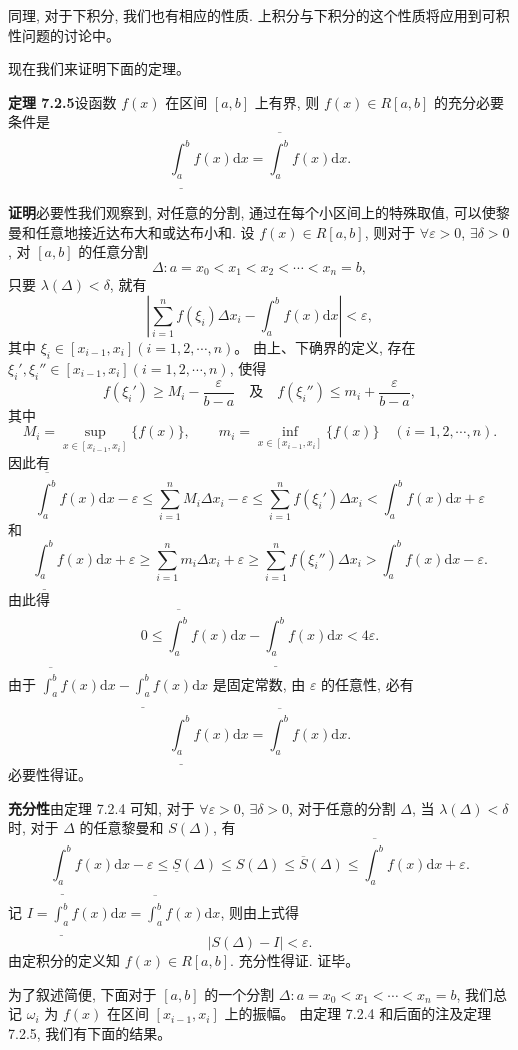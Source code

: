 \documentclass[UTF8,12pt,a4paper,fontset=fandol]{ctexart}
\begin{document}
同理, 对于下积分, 我们也有相应的性质. 上积分与下积分的这个性质将应用到可积性问题的讨论中。

现在我们来证明下面的定理。

\noindent\textbf{定理 7.2.5}\quad 设函数 $f(x)$ 在区间 $[a,b]$ 上有界, 则 $f(x)\in R[a,b]$ 的充分必要条件是
\[
  \underline{\int_a^b} f(x)\mathrm dx=\overline{\int_a^b} f(x)\mathrm dx.
\]

\noindent\textbf{证明}\quad 必要性\quad 我们观察到, 对任意的分割, 通过在每个小区间上的特殊取值, 可以使黎曼和任意地接近达布大和或达布小和. 设 $f(x)\in R[a,b]$, 则对于 $\forall\varepsilon>0$, $\exists\delta>0$, 对 $[a,b]$ 的任意分割
\[
  \Delta:a=x_0<x_1<x_2<\cdots<x_n=b,
\]
只要 $\lambda(\Delta)<\delta$, 就有
\[
  \left|\sum_{i=1}^n f(\xi_i)\Delta x_i-\int_a^b f(x)\mathrm dx\right|<\varepsilon,
\]
其中 $\xi_i\in[x_{i-1},x_i](i=1,2,\cdots,n)$。
由上、下确界的定义, 存在 $\xi_i',\xi_i''\in[x_{i-1},x_i](i=1,2,\cdots,n)$, 使得
\[
  f(\xi_i')\geq M_i-\frac{\varepsilon}{b-a}\quad\text{及}\quad f(\xi_i'')\leq m_i+\frac{\varepsilon}{b-a},
\]
其中
\[
  M_i=\sup_{x\in[x_{i-1},x_i]}\{f(x)\},\qquad
  m_i=\inf_{x\in[x_{i-1},x_i]}\{f(x)\}\quad(i=1,2,\cdots,n).
\]
因此有
\[
  \overline{\int_a^b} f(x)\mathrm dx-\varepsilon
  \leq \sum_{i=1}^n M_i\Delta x_i-\varepsilon
  \leq \sum_{i=1}^n f(\xi_i')\Delta x_i
  < \int_a^b f(x)\mathrm dx+\varepsilon
\]
和
\[
  \underline{\int_a^b} f(x)\mathrm dx+\varepsilon
  \geq \sum_{i=1}^n m_i\Delta x_i+\varepsilon
  \geq \sum_{i=1}^n f(\xi_i'')\Delta x_i
  > \int_a^b f(x)\mathrm dx-\varepsilon.
\]
由此得
\[
  0\leq \overline{\int_a^b} f(x)\mathrm dx-\underline{\int_a^b} f(x)\mathrm dx<4\varepsilon.
\]
由于 $\overline{\int_a^b} f(x)\mathrm dx-\underline{\int_a^b} f(x)\mathrm dx$ 是固定常数, 由 $\varepsilon$ 的任意性, 必有
\[
  \underline{\int_a^b} f(x)\mathrm dx=\overline{\int_a^b} f(x)\mathrm dx.
\]
必要性得证。

\noindent\textbf{充分性}\quad 由定理 7.2.4 可知, 对于 $\forall\varepsilon>0$, $\exists\delta>0$, 对于任意的分割 $\Delta$, 当 $\lambda(\Delta)<\delta$ 时, 对于 $\Delta$ 的任意黎曼和 $S(\Delta)$, 有
\[
  \underline{\int_a^b} f(x)\mathrm dx-\varepsilon
  \leq \underline S(\Delta)\leq S(\Delta)\leq \overline S(\Delta)
  \leq \overline{\int_a^b} f(x)\mathrm dx+\varepsilon.
\]
记 $I=\underline{\int_a^b} f(x)\mathrm dx=\overline{\int_a^b} f(x)\mathrm dx$, 则由上式得
\[
  |S(\Delta)-I|<\varepsilon.
\]
由定积分的定义知 $f(x)\in R[a,b]$. 充分性得证. 证毕。

为了叙述简便, 下面对于 $[a,b]$ 的一个分割 $\Delta:a=x_0<x_1<\cdots<x_n=b$, 我们总记 $\omega_i$ 为 $f(x)$ 在区间 $[x_{i-1},x_i]$ 上的振幅。
由定理 7.2.4 和后面的注及定理 7.2.5, 我们有下面的结果。
\end{document}
